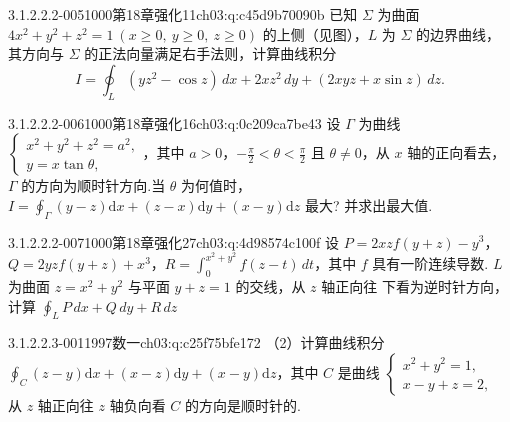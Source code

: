 \par\addvspace{\qsep}\noindent
\begin{minipage}{\linewidth}
\begin{q}{3.1.2.2.2-005}{1000第18章强化11}{ch03:q:c45d9b70090b}
已知 $\Sigma$ 为曲面 $4x^2+y^2+z^2=1\ (x\geqslant 0,\ y\geqslant 0,\ z\geqslant 0)$ 的上侧（见图），$L$ 为 $\Sigma$ 的边界曲线，其方向与 $\Sigma$ 的正法向量满足右手法则，计算曲线积分
\[
I=\oint_L(yz^2-\cos z)\,dx+2xz^2\,dy+(2xyz+x\sin z)\,dz.
\]
\text{[见图]}
\begin{figblock}
\end{figblock}
\end{q}
\end{minipage}


\begin{q}{3.1.2.2.2-006}{1000第18章强化16}{ch03:q:0c209ca7be43}
设 $\Gamma$ 为曲线 $\begin{cases}x^2+y^2+z^2=a^2,\\ y=x\tan\theta,\end{cases}$，其中 $a>0$，$-\frac{\pi}{2}<\theta<\frac{\pi}{2}$ 且 $\theta\neq 0$，从 $x$ 轴的正向看去，$\Gamma$ 的方向为顺时针方向.当 $\theta$ 为何值时，$\displaystyle I=\oint_{\Gamma}(y-z)\mathrm{d}x+(z-x)\mathrm{d}y+(x-y)\mathrm{d}z$ 最大? 并求出最大值.
\end{q}

\begin{q}{3.1.2.2.2-007}{1000第18章强化27}{ch03:q:4d98574c100f}
设 $P=2xzf(y+z)-y^3$，$Q=2yzf(y+z)+x^3$，$\displaystyle R=\int_0^{x^2+y^2} f(z-t)\,dt$，其中 $f$ 具有一阶连续导数. $L$ 为曲面 $z=x^2+y^2$ 与平面 $y+z=1$ 的交线，从 $z$ 轴正向往 下看为逆时针方向，计算 $\displaystyle \oint_L P\,dx+Q\,dy+R\,dz$
\end{q}

\par\addvspace{2.4ex}\noindent
\begin{minipage}{\linewidth}

\begin{q}{3.1.2.2.3-001}{1997数一}{ch03:q:c25f75bfe172}
（2）计算曲线积分 $\displaystyle \oint_C (z-y)\mathrm{d}x+(x-z)\mathrm{d}y+(x-y)\mathrm{d}z$，其中 $C$ 是曲线 $\begin{cases} x^2+y^2=1, \\ x-y+z=2, \end{cases}$ 从 $z$ 轴正向往 $z$ 轴负向看 $C$ 的方向是顺时针的.
\end{q}
\end{minipage}


